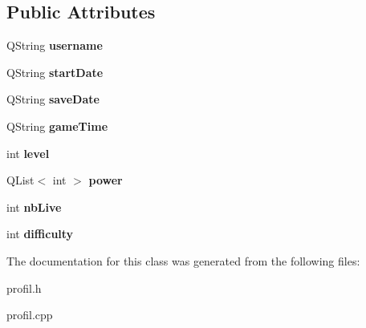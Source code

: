 \subsection*{Public Attributes}
\begin{DoxyCompactItemize}
\item 
\hypertarget{class_profil_a89a51837f12f3677bf066144f9d37e2f}{}Q\+String {\bfseries username}\label{class_profil_a89a51837f12f3677bf066144f9d37e2f}

\item 
\hypertarget{class_profil_a2889a1384cd384c59e4b2951fcb4867c}{}Q\+String {\bfseries start\+Date}\label{class_profil_a2889a1384cd384c59e4b2951fcb4867c}

\item 
\hypertarget{class_profil_a0c75387fbebb268dfbde16f6e57765b0}{}Q\+String {\bfseries save\+Date}\label{class_profil_a0c75387fbebb268dfbde16f6e57765b0}

\item 
\hypertarget{class_profil_a99010796e52e896f8c98362c5d1b7457}{}Q\+String {\bfseries game\+Time}\label{class_profil_a99010796e52e896f8c98362c5d1b7457}

\item 
\hypertarget{class_profil_afaa96616ab12811ed8cdc1bcff349193}{}int {\bfseries level}\label{class_profil_afaa96616ab12811ed8cdc1bcff349193}

\item 
\hypertarget{class_profil_a9c398ab8193c440a7e8b8cde66385a78}{}Q\+List$<$ int $>$ {\bfseries power}\label{class_profil_a9c398ab8193c440a7e8b8cde66385a78}

\item 
\hypertarget{class_profil_abcfe0990f019dcf34bf535c99e76113a}{}int {\bfseries nb\+Live}\label{class_profil_abcfe0990f019dcf34bf535c99e76113a}

\item 
\hypertarget{class_profil_afd73c0f18883202151bd7fddda5b55aa}{}int {\bfseries difficulty}\label{class_profil_afd73c0f18883202151bd7fddda5b55aa}

\end{DoxyCompactItemize}


The documentation for this class was generated from the following files\+:\begin{DoxyCompactItemize}
\item 
profil.\+h\item 
profil.\+cpp\end{DoxyCompactItemize}

